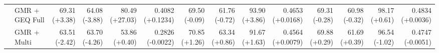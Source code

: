 \documentclass{article}
\begin{document}
{\begin{tabular}{llrrrrrrrrrrrr}
 & GMR + GEQ Full & \shortstack{69.31 \\ {\scriptsize\textcolor{Gain}{(+3.38)}}} & \shortstack{64.08 \\ {\scriptsize\textcolor{Loss}{(-3.88)}}} & \shortstack{80.49 \\ {\scriptsize\textcolor{Gain}{(+27.03)}}} & \shortstack{0.4082 \\ {\scriptsize\textcolor{Gain}{(+0.1234)}}} & \shortstack{69.50 \\ {\scriptsize\textcolor{Loss}{(-0.09)}}} & \shortstack{61.76 \\ {\scriptsize\textcolor{Loss}{(-0.72)}}} & \shortstack{93.90 \\ {\scriptsize\textcolor{Gain}{(+3.86)}}} & \shortstack{0.4653 \\ {\scriptsize\textcolor{Gain}{(+0.0168)}}} & \shortstack{69.31 \\ {\scriptsize\textcolor{Loss}{(-0.28)}}} & \shortstack{60.98 \\ {\scriptsize\textcolor{Loss}{(-0.32)}}} & \shortstack{98.17 \\ {\scriptsize\textcolor{Gain}{(+0.61)}}} & \shortstack{0.4834 \\ {\scriptsize\textcolor{Gain}{(+0.0036)}}} \\
 & GMR + Multi & \shortstack{63.51 \\ {\scriptsize\textcolor{Loss}{(-2.42)}}} & \shortstack{63.70 \\ {\scriptsize\textcolor{Loss}{(-4.26)}}} & \shortstack{53.86 \\ {\scriptsize\textcolor{Gain}{(+0.40)}}} & \shortstack{0.2826 \\ {\scriptsize\textcolor{Loss}{(-0.0022)}}} & \shortstack{70.85 \\ {\scriptsize\textcolor{Gain}{(+1.26)}}} & \shortstack{63.34 \\ {\scriptsize\textcolor{Gain}{(+0.86)}}} & \shortstack{91.67 \\ {\scriptsize\textcolor{Gain}{(+1.63)}}} & \shortstack{0.4564 \\ {\scriptsize\textcolor{Gain}{(+0.0079)}}} & \shortstack{69.88 \\ {\scriptsize\textcolor{Gain}{(+0.29)}}} & \shortstack{61.69 \\ {\scriptsize\textcolor{Gain}{(+0.39)}}} & \shortstack{96.54 \\ {\scriptsize\textcolor{Loss}{(-1.02)}}} & \shortstack{0.4747 \\ {\scriptsize\textcolor{Loss}{(-0.0051)}}} \\

\end{tabular}}
\end{document}
